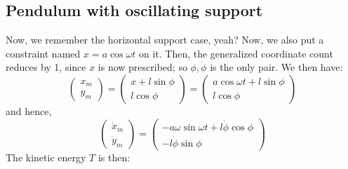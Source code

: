 \subsection{Pendulum with oscillating support}
Now, we remember the horizontal support case, yeah? Now, we also put a constraint named $x=a\cos{\omega t}$ on it. Then, the generalized coordinate count reduces by 1, since $x$ is now prescribed; so $\phi, \dot{\phi}$ is the only pair. We then have: 
\begin{equation}
    \begin{pmatrix}
        x_{m} \\
        y_{m}
    \end{pmatrix}
    =
    \begin{pmatrix}
        x + l \sin{\phi}\\
        l\cos{\phi}
    \end{pmatrix}
    = 
    \begin{pmatrix}
        a\cos{\omega t} + l \sin{\phi}\\
        l\cos{\phi}
    \end{pmatrix}
\end{equation}
and hence, 
\begin{equation}
    \begin{pmatrix}
        \dot{x}_{m}\\
        \dot{y}_{m}
    \end{pmatrix}
    = 
    \begin{pmatrix}
        -a\omega\sin{\omega t} + l\dot{\phi}\cos{\phi}\\
        -l\dot{\phi} \sin{\phi}
    \end{pmatrix}
\end{equation}
The kinetic energy $T$ is then: 

